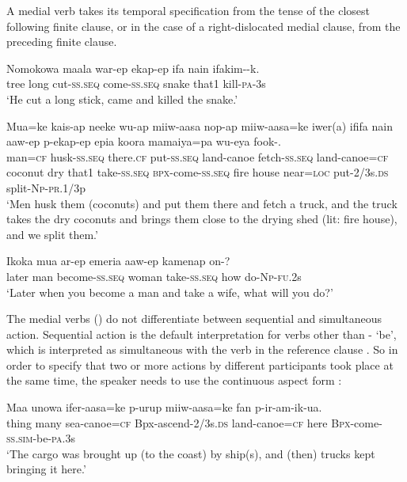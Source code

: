 A medial verb takes its temporal specification from the tense of the closest following finite clause, or in the case of a right-dislocated medial clause, from the preceding finite clause.

\ea%
\label{ex:8:x1442}
\gll Nomokowa  maala  war-ep    ekap-ep  ifa  nain  ifakim--k.\\
tree  long  cut-\textsc{ss}.\textsc{seq} come-\textsc{ss}.\textsc{seq} snake that1 kill-\textsc{pa}-3s\\
\glt`He cut a long stick, came and killed the snake.'
\z


\ea%
\label{ex:8:x1444}
\gll Mua=ke  kais-ap  neeke  wu-ap  miiw-aasa  nop-ap miiw-aasa=ke  iwer(a)  ififa  nain  aaw-ep  p-ekap-ep epia  koora  mamaiya=pa  wu-eya  fook-.\\
man=\textsc{cf} husk-\textsc{ss}.\textsc{seq} there.\textsc{cf} put-\textsc{ss}.\textsc{seq} land-canoe fetch-\textsc{ss}.\textsc{seq} land-canoe=\textsc{cf} coconut dry that1 take-\textsc{ss}.\textsc{seq} \textsc{\textsc{bp}x}-come-\textsc{ss}.\textsc{seq} fire house near=\textsc{loc} put-2/3s.\textsc{ds} split-\textsc{Np}-\textsc{pr}.1/3p\\
\glt`Men husk them (coconuts) and put them there and fetch a truck, and the truck takes the dry coconuts and brings them close to the drying shed (lit: fire house), and we split them.'
\z


\ea%
\label{ex:8:x1445}
\gll Ikoka  mua  ar-ep  emeria  aaw-ep  kamenap  on-? \\
later  man  become-\textsc{ss}.\textsc{seq} woman take-\textsc{ss}.\textsc{seq} how do-\textsc{Np}-\textsc{fu}.2s\\
\glt`Later when you become a man and take a wife, what will you do?'
\z


The  medial verbs () do not differentiate between sequential and simultaneous action. Sequential action  is the default interpretation for verbs other than - `be', which is interpreted as simultaneous with the verb in the reference clause . So in order to specify that two or more actions by different participants took place at the same time, the speaker needs to use the continuous aspect form :

\ea%
\label{ex:8:x1502}
\gll Maa  unowa  ifer-aasa=ke  p-urup miiw-aasa=ke fan  p-ir-am-ik-ua.\\
thing  many  sea-canoe=\textsc{cf} Bpx-ascend-2/3s.\textsc{ds} land-canoe=\textsc{cf} here \textsc{Bpx}-come-\textsc{ss}.\textsc{sim}-be-\textsc{pa}.3s\\
\glt`The cargo was brought up (to the coast) by ship(s), and (then) trucks kept bringing it here.'
\z


